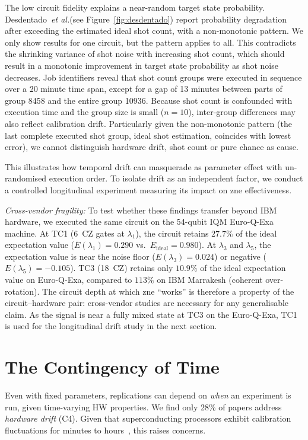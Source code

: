 \documentclass[10pt,conference]{IEEEtran}
\newcommand{\etal}{\emph{et al.}\xspace}
\begin{document}
The low circuit fidelity explains a near-random target state probability. Desdentado~\etal (see Figure~\ref{fig:desdentado}) report probability degradation after exceeding the estimated ideal shot count, with a non-monotonic pattern. We only show results for one circuit, but the pattern applies to all. This contradicts the shrinking variance of shot noise with increasing shot count, which should result in a monotonic improvement in target state probability as shot noise decreases. Job identifiers reveal that shot count groups were executed in sequence over a 20 minute time span, except for a gap of 13 minutes between parts of group 8458 and the entire group 10936. Because shot count is confounded with execution time and the group size is small ($n = 10$), inter-group differences may also reflect calibration drift. Particularly given the non-monotonic pattern (the last complete executed shot group, ideal shot estimation, coincides with lowest error), we cannot distinguish hardware drift, shot count or pure chance as cause. 

This illustrates how temporal drift can masquerade as parameter effect with un-randomised execution order. To isolate drift as an independent factor, we conduct a controlled longitudinal experiment measuring its impact on \gls{zne} effectiveness.

\emph{Cross-vendor fragility:} To test whether these findings transfer beyond IBM hardware, we executed the same circuit on the 54-qubit IQM Euro-Q-Exa~\cite{qexa} machine. At TC1 (6~CZ gates at $\lambda_1$), the circuit retains $27.7\%$ of the ideal expectation value ($\bar{E}(\lambda_1) = 0.290$ vs.\ $E_\text{ideal} = 0.980$). At $\lambda_3$ and $\lambda_5$, the expectation value is near the noise floor ($E(\lambda_3) = 0.024$) or negative ($E(\lambda_5) = -0.105$). TC3 (18~CZ) retains only $10.9\%$ of the ideal expectation value on Euro-Q-Exa, compared to $113\%$ on IBM Marrakesh (coherent over-rotation). The circuit depth at which \gls{zne} \enquote{works} is therefore a property of the circuit--hardware pair: cross-vendor studies are necessary for any generalisable claim. As the signal is near a fully mixed state at TC3 on the Euro-Q-Exa, TC1 is used for the longitudinal drift study in the next section.

\section{The Contingency of Time}
\label{sec:hardware_drift}
Even with fixed parameters, replications can depend on \emph{when} an experiment is run, given time-varying HW properties. We find only 28\% of papers address \emph{hardware drift} (C4). Given that superconducting processors exhibit calibration fluctuations for minutes to hours~\cite{hirasaki_detection_2023, senapati_towards_2023}, this raises concerns.
\end{document}
